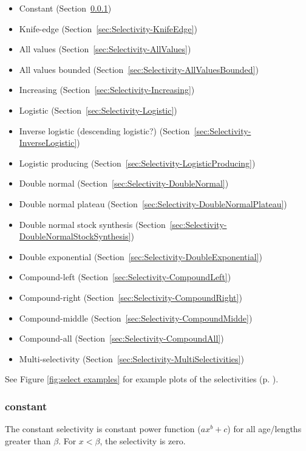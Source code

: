 \begin{itemize}
	\item Constant (Section~\ref{sec:Selectivity-Constant})
	\item Knife-edge (Section~\ref{sec:Selectivity-KnifeEdge})
	\item All values (Section~\ref{sec:Selectivity-AllValues})
	\item All values bounded (Section~\ref{sec:Selectivity-AllValuesBounded})
	\item Increasing (Section~\ref{sec:Selectivity-Increasing})
	\item Logistic (Section~\ref{sec:Selectivity-Logistic})
	\item Inverse logistic (descending logistic?) (Section~\ref{sec:Selectivity-InverseLogistic})
	\item Logistic producing (Section~\ref{sec:Selectivity-LogisticProducing})
	\item Double normal (Section~\ref{sec:Selectivity-DoubleNormal})
	\item Double normal plateau (Section~\ref{sec:Selectivity-DoubleNormalPlateau})
	\item Double normal stock synthesis (Section~\ref{sec:Selectivity-DoubleNormalStockSynthesis})
	\item Double exponential (Section~\ref{sec:Selectivity-DoubleExponential})
	\item Compound-left (Section~\ref{sec:Selectivity-CompoundLeft})
	\item Compound-right (Section~\ref{sec:Selectivity-CompoundRight})
	\item Compound-middle (Section~\ref{sec:Selectivity-CompoundMidde})
	\item Compound-all (Section~\ref{sec:Selectivity-CompoundAll})
	\item Multi-selectivity  (Section~\ref{sec:Selectivity-MultiSelectivities})
\end{itemize}

See Figure \ref{fig:select examples} for example plots of the selectivities (p. \pageref{fig:select examples}).

\subsubsection[Constant]{{constant}}\label{sec:Selectivity-Constant}

The constant selectivity is constant power function ($ax^b+c$) for all age/lengths greater than $\beta$. For $x < \beta$, the selectivity is zero.

